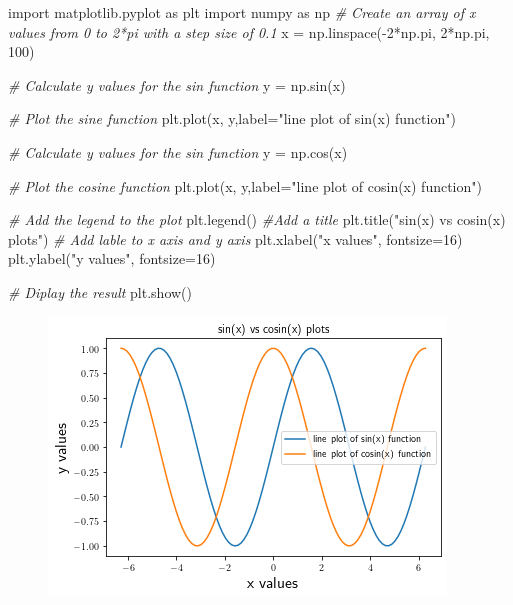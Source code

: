 \documentclass[11pt]{article}
\newenvironment{Shaded}{}{}
\newcommand{\DecValTok}[1]{\textcolor[rgb]{0.25,0.63,0.44}{{#1}}}
\newcommand{\StringTok}[1]{\textcolor[rgb]{0.25,0.44,0.63}{{#1}}}
\newcommand{\CommentTok}[1]{\textcolor[rgb]{0.38,0.63,0.69}{\textit{{#1}}}}
\newcommand{\NormalTok}[1]{{#1}}
\newcommand{\ImportTok}[1]{{#1}}
\newcommand{\OperatorTok}[1]{\textcolor[rgb]{0.40,0.40,0.40}{{#1}}}
\begin{document}
\begin{Shaded}
\begin{Highlighting}[]
\ImportTok{import}\NormalTok{ matplotlib.pyplot }\ImportTok{as}\NormalTok{ plt}
\ImportTok{import}\NormalTok{ numpy }\ImportTok{as}\NormalTok{ np}
\CommentTok{\# Create an array of x values from 0 to 2*pi with a step size of 0.1}
\NormalTok{x }\OperatorTok{=}\NormalTok{ np.linspace(}\OperatorTok{{-}}\DecValTok{2}\OperatorTok{*}\NormalTok{np.pi, }\DecValTok{2}\OperatorTok{*}\NormalTok{np.pi, }\DecValTok{100}\NormalTok{)}

\CommentTok{\# Calculate y values for the sin function}
\NormalTok{y }\OperatorTok{=}\NormalTok{ np.sin(x)}

\CommentTok{\# Plot the sine function}
\NormalTok{plt.plot(x, y,label}\OperatorTok{=}\StringTok{"line plot of sin(x) function"}\NormalTok{)}

\CommentTok{\# Calculate y values for the sin function}
\NormalTok{y }\OperatorTok{=}\NormalTok{ np.cos(x)}

\CommentTok{\# Plot the cosine function}
\NormalTok{plt.plot(x, y,label}\OperatorTok{=}\StringTok{"line plot of cosin(x) function"}\NormalTok{)}

\CommentTok{\# Add the legend to the plot}
\NormalTok{plt.legend()}
\CommentTok{\#Add a title}
\NormalTok{plt.title(}\StringTok{"sin(x) vs cosin(x) plots"}\NormalTok{)}
\CommentTok{\# Add lable to x axis and y axis}
\NormalTok{plt.xlabel(}\StringTok{"x values"}\NormalTok{, fontsize}\OperatorTok{=}\DecValTok{16}\NormalTok{)}
\NormalTok{plt.ylabel(}\StringTok{"y values"}\NormalTok{, fontsize}\OperatorTok{=}\DecValTok{16}\NormalTok{)}

\CommentTok{\# Diplay the result}
\NormalTok{plt.show()}
\end{Highlighting}
\end{Shaded}

\begin{figure}
\centering
\includegraphics[scale=0.6]{xylabels.png}
\end{figure}
\end{document}
